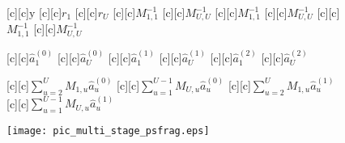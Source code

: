 \documentclass{article}
\begin{document}
\begin{figure}[htb]
  \begin{center}


        [c][c]{$\mathbf{\mathrm{y}}$}
        [c][c]{$r_1$}
        [c][c]{$r_U$}
\small
        [c][c]{\small$M_{1,1}^{-1}$}
        [c][c]{\footnotesize$M_{U,U}^{-1}$}
        [c][c]{\footnotesize$M_{1,1}^{-1}$}
        [c][c]{\footnotesize$M_{U,U}^{-1}$}
        [c][c]{\footnotesize$M_{1,1}^{-1}$}
        [c][c]{\footnotesize$M_{U,U}^{-1}$}

        [c][c]{\footnotesize$\hat{a}_1^{(0)}$}
        [c][c]{\footnotesize$\hat{a}_U^{(0)}$}
        [c][c]{\footnotesize$\hat{a}_1^{(1)}$}
        [c][c]{\footnotesize$\hat{a}_U^{(1)}$}
        [c][c]{\footnotesize$\hat{a}_1^{(2)}$}
        [c][c]{\footnotesize$\hat{a}_U^{(2)}$}

        [c][c]{\footnotesize$\sum\limits_{u=2}^{U}M_{1,u}\hat{a}_u^{(0)}$}
        [c][c]{\footnotesize$\sum\limits_{u=1}^{U-1}M_{U,u}\hat{a}_u^{(0)}$}
        [c][c]{\footnotesize$\sum\limits_{u=2}^{U}M_{1,u}\hat{a}_u^{(1)}$}
        [c][c]{\footnotesize$\sum\limits_{u=1}^{U-1}M_{U,u}\hat{a}_u^{(1)}$}
\normalsize



    \texttt{[image: pic\_multi\_stage\_psfrag.eps]}
    \end{center}
\end{figure}
\end{document}
